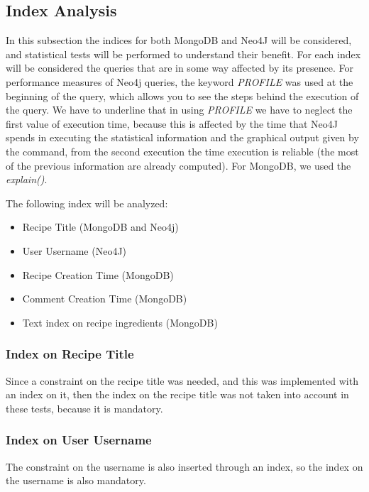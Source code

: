 \documentclass[a4paper]{report}
\begin{document}
\subsection{Index Analysis}

In this subsection the indices for both MongoDB and Neo4J will be considered, and statistical tests will be performed to understand their benefit. For each index will be considered the queries that are in some way affected by its presence. For performance measures of Neo4j queries, the keyword \emph{PROFILE} was used at the beginning of the query, which allows you to see the steps behind the execution of the query. We have to underline that in using \emph{PROFILE} we have to neglect the first value of execution time, because this is affected by the time that Neo4J spends in executing the statistical information and the graphical output given by the command, from the second execution the time execution is reliable (the most of the previous information are already computed). For MongoDB, we used the \emph{explain()}.

\noindent The following index will be analyzed:
\begin{itemize}
	\item Recipe Title (MongoDB and Neo4j)
	\item User Username (Neo4J)
	\item Recipe Creation Time (MongoDB)
	\item Comment Creation Time (MongoDB)
	\item Text index on recipe ingredients (MongoDB)
\end{itemize}

\subsubsection {Index on Recipe Title}
Since a constraint on the recipe title was needed, and this was implemented with an index on it, then the index on the recipe title was not taken into account in these tests, because it is mandatory.

\subsubsection {Index on User Username}
The constraint on the username is also inserted through an index, so the index on the username is also mandatory.
\end{document}
